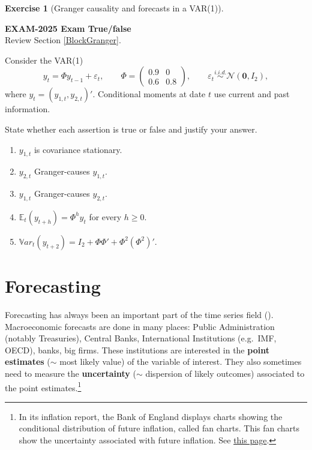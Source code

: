 \documentclass[
  11pt,
]{book}
\providecommand{\tightlist}{%
  \setlength{\itemsep}{0pt}\setlength{\parskip}{0pt}}
\theoremstyle{definition}
\theoremstyle{definition}
\theoremstyle{definition}
\newtheorem{exercise}{Exercise}[chapter]
\theoremstyle{definition}
\theoremstyle{remark}
\begin{document}
\begin{exercisebox}

\begin{exercise}[Granger causality and forecasts in a VAR(1)]
\protect\hypertarget{exr:ex-exam2025-var-granger-forecasts}{}\label{exr:ex-exam2025-var-granger-forecasts}

\textbf{EXAM-2025 \textbar{} Exam \textbar{} True/false}\\
Review Section \ref{BlockGranger}.

Consider the VAR(1)
\[
y_t=\Phi y_{t-1}+\varepsilon_t,
\qquad
\Phi=\begin{pmatrix}0.9&0\\0.6&0.8\end{pmatrix},
\qquad
\varepsilon_t\overset{i.i.d.}{\sim}\mathcal N(\mathbf 0,I_2),
\]
where \(y_t=(y_{1,t},y_{2,t})'\). Conditional moments at date \(t\) use current and past information.

State whether each assertion is true or false and justify your answer.

\begin{enumerate}
\def\labelenumi{\arabic{enumi}.}
\tightlist
\item
  \(y_{1,t}\) is covariance stationary.
\item
  \(y_{2,t}\) Granger-causes \(y_{1,t}\).
\item
  \(y_{1,t}\) Granger-causes \(y_{2,t}\).
\item
  \(\mathbb E_t(y_{t+h})=\Phi^hy_t\) for every \(h\ge0\).
\item
  \(\mathbb{V}ar_t(y_{t+2})=I_2+\Phi\Phi'+\Phi^2(\Phi^2)'\).
\end{enumerate}

\end{exercise}

\end{exercisebox}

\chapter{Forecasting}\label{forecasting}

Forecasting has always been an important part of the time series field (\citet{DEGOOIJER2006443}). Macroeconomic forecasts are done in many places: Public Administration (notably Treasuries), Central Banks, International Institutions (e.g.~IMF, OECD), banks, big firms. These institutions are interested in the \textbf{point estimates} (\(\sim\) most likely value) of the variable of interest. They also sometimes need to measure the \textbf{uncertainty} (\(\sim\) dispersion of likely outcomes) associated to the point estimates.\footnote{In its inflation report, the Bank of England displays charts showing the conditional distribution of future inflation, called fan charts. This fan charts show the uncertainty associated with future inflation. See \href{https://www.bankofengland.co.uk/quarterly-bulletin/1998/q1/the-inflation-report-projections-understanding-the-fan-chart}{this page}.}
\end{document}
